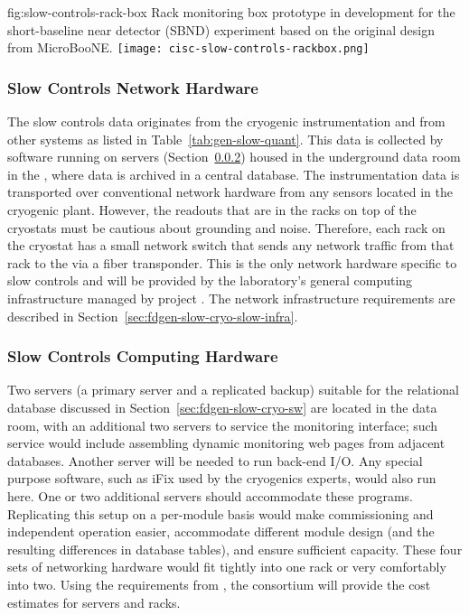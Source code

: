 \begin{dunefigure}{fig:slow-controls-rack-box}
{Rack monitoring box prototype in development for the short-baseline near detector (SBND) experiment based on the original design from MicroBooNE.}
\texttt{[image: cisc-slow-controls-rackbox.png]}
\end{dunefigure}


\subsubsection{Slow Controls Network Hardware}
\label{sec:fdgen-slow-cryo-slow-network}
The slow controls data originates from the cryogenic instrumentation and from other systems as listed in Table~\ref{tab:gen-slow-quant}. This data is collected by software running on servers
(Section~\ref{sec:fdgen-slow-cryo-slow-compute})
housed in the underground data room in the ,
where data is archived in a central  database.
The instrumentation data is transported over
conventional network hardware from any sensors located in the cryogenic
plant.  However, the readouts that are in the racks on top of the
cryostats must be cautious about grounding and noise.  Therefore, each
rack on the cryostat has a small network switch that sends
any network traffic from that rack to the  via a fiber transponder.
This is the only network hardware specific to slow controls and will be provided by the laboratory's general computing infrastructure managed by project . The network infrastructure requirements are described in
Section~\ref{sec:fdgen-slow-cryo-slow-infra}.

\subsubsection{Slow Controls Computing Hardware}
\label{sec:fdgen-slow-cryo-slow-compute}
Two servers (a primary server and a replicated backup) suitable for the relational database discussed
in Section~\ref{sec:fdgen-slow-cryo-sw} are located in the  data
room, with an additional
two servers to service the  monitoring interface; such service would include assembling dynamic  monitoring web pages from adjacent
databases.  Another server will be needed to run back-end I/O.  Any special purpose software, such as iFix used by the cryogenics experts, would
also run here. One or two additional servers should accommodate these programs.
Replicating this setup on a per-module basis would make commissioning and independent operation easier, accommodate different module
design (and the resulting differences in database tables), and ensure
sufficient capacity.  These four sets of networking hardware would fit tightly into one rack or very comfortably into two. Using the requirements from , the  consortium will provide the cost estimates for servers and racks. 

